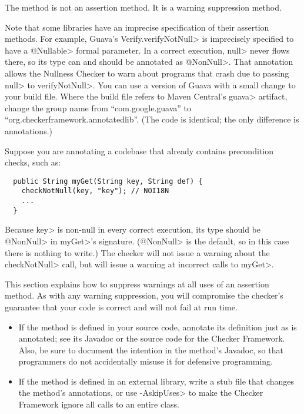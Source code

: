 The method
 is not an
assertion method.  It is a warning suppression method.

Note that some libraries have an imprecise specification of their assertion
methods.  For example, Guava's \<Verify.verifyNotNull> is imprecisely
specified to have a \<@Nullable> formal parameter.  In a correct execution,
\<null> never flows there, so its type can and should be annotated as
\<@NonNull>.  That annotation allows the Nullness Checker to warn about
programs that crash due to passing \<null> to \<verifyNotNull>.  You can
use a version of Guava with a small change to your build file.  Where the
build file refers to Maven Central's \<guava> artifact, change the group
name from ``com.google.guava'' to ``org.checkerframework.annotatedlib''.
(The code is identical; the only difference is annotations.)


Suppose you are annotating a codebase that already contains precondition checks,
such as:

\begin{Verbatim}
  public String myGet(String key, String def) {
    checkNotNull(key, "key"); // NOI18N
    ...
  }
\end{Verbatim}

\noindent
Because \<key> is non-null in every correct execution, its type should be
\<@NonNull> in \<myGet>'s signature.  (\<@NonNull> is the default, so in
this case there is nothing to write.)  The checker will not issue a warning
about the \<checkNotNull> call, but will issue a warning at incorrect calls
to \<myGet>.


This section explains how to suppress warnings at all uses of an assertion
method.  As with any warning suppression, you will compromise the checker's
guarantee that your code is correct and will not fail at run time.

\begin{itemize}
\item
  If the method is defined in your source code, annotate its definition just as
   is
  annotated; see its Javadoc or the source code for the Checker Framework.
  Also, be sure to document the intention in the method's Javadoc, so that
  programmers do not
  accidentally misuse it for defensive programming.
\item
  If the method is defined in an external library, write a stub file that
  changes the method's annotations, or use \<-AskipUses> to make the
  Checker Framework ignore all calls to an entire class.
\end{itemize}


